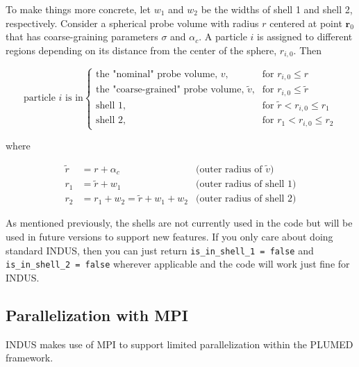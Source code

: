 \documentclass[11pt,notitlepage]{article}
\begin{document}

To make things more concrete, let $w_1$ and $w_2$ be the widths of shell 1 and shell 2, respectively. Consider a spherical probe volume with radius $r$ centered at point $\mathbf{r}_0$ that has coarse-graining parameters $\sigma$ and $\alpha_c$. A particle $i$ is assigned to different regions depending on its distance from the center of the sphere, $r_{i,0}$. Then

\begin{equation}
	\text{particle $i$ is in}
	\begin{cases}
		\text{the "nominal" probe volume, $v$,}
			& \text{for } r_{i,0} \leq r \\
		\text{the "coarse-grained" probe volume, $\tilde{v}$,}
			& \text{for } r_{i,0} \leq \tilde{r} \\
		\text{shell 1,}
			& \text{for } \tilde{r} < r_{i,0} \leq r_1 \\
		\text{shell 2,}
			& \text{for } r_1 < r_{i,0} \leq r_2
	\end{cases}
\end{equation}

\noindent where

\begin{align}
	\tilde{r} &= r + \alpha_c                       & \text{(outer radius of $\tilde{v}$)} \\
	r_1       &= \tilde{r} + w_1                    & \text{(outer radius of shell 1)} \\
	r_2       &= r_1 + w_2 = \tilde{r} + w_1 + w_2  & \text{(outer radius of shell 2)}
\end{align}


As mentioned previously, the shells are not currently used in the code but will be used in future versions to support new features. If you only care about doing standard INDUS, then you can just return \texttt{is\_in\_shell\_1 = false} and \texttt{is\_in\_shell\_2 = false} wherever applicable and the code will work just fine for INDUS.


\subsection{Parallelization with MPI}

INDUS makes use of MPI to support limited parallelization within the PLUMED framework.








\end{document}
